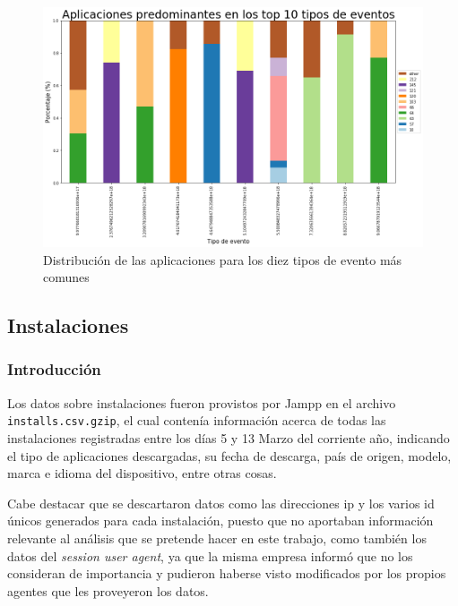 \documentclass[a4paper, 12pt]{article}
\begin{document}
		\FloatBarrier
		\begin{figure}[h]
			\centering
			\includegraphics[width=\textwidth]{images/events/appsxev.png}
			\caption{Distribución de las aplicaciones para los diez tipos de evento más comunes}
		\end{figure}
		\FloatBarrier
		
		
		
\clearpage
\subsection{Instalaciones}
	\subsubsection{Introducción}
		Los datos sobre instalaciones fueron provistos por Jampp en el archivo \texttt{installs.csv.gzip}, el cual contenía información acerca de todas las instalaciones registradas entre los días 5 y 13  Marzo del corriente año, indicando el tipo de aplicaciones descargadas, su fecha de descarga, país de origen, modelo, marca e idioma del dispositivo, entre otras cosas.

		Cabe destacar que se descartaron datos como las direcciones ip y los varios id únicos generados para cada instalación, puesto que no aportaban información relevante al análisis que se pretende hacer en este trabajo, como también los datos del \textit{session user agent}, ya que la misma empresa informó que no los consideran de importancia y pudieron haberse visto modificados por los propios agentes que les proveyeron los datos.
\end{document}
